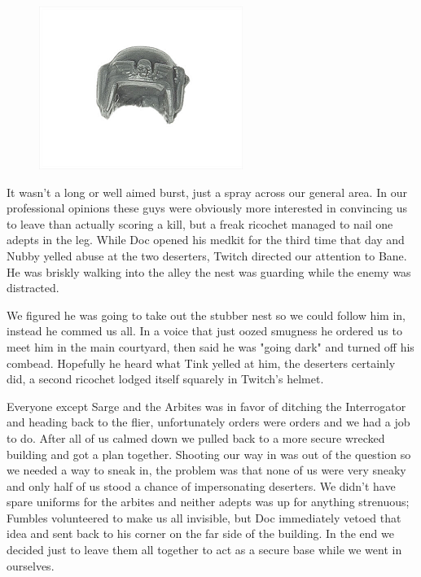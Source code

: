 \begin{figure}
	\begin{center}
		\includegraphics[width=\figwidth]{pics/9/24.png}
	\end{center}
\end{figure}
It wasn't a long or well aimed burst, just a spray across our general area. 
In our professional opinions these guys were obviously more interested in convincing us to leave than actually scoring a kill, but a freak ricochet managed to nail one adepts in the leg. 
While Doc opened his medkit for the third time that day and Nubby yelled abuse at the two deserters, Twitch directed our attention to Bane. 
He was briskly walking into the alley the nest was guarding while the enemy was distracted. 


We figured he was going to take out the stubber nest so we could follow him in, instead he commed us all. 
In a voice that just oozed smugness he ordered us to meet him in the main courtyard, then said he was "going dark" and turned off his combead. 
Hopefully he heard what Tink yelled at him, the deserters certainly did, a second ricochet lodged itself squarely in Twitch's helmet.

Everyone except Sarge and the Arbites was in favor of ditching the Interrogator and heading back to the flier, unfortunately orders were orders and we had a job to do. 
After all of us calmed down we pulled back to a more secure wrecked building and got a plan together. 
Shooting our way in was out of the question so we needed a way to sneak in, the problem was that none of us were very sneaky and only half of us stood a chance of impersonating deserters. 
We didn't have spare uniforms for the arbites and neither adepts was up for anything strenuous; 
Fumbles volunteered to make us all invisible, but Doc immediately vetoed that idea and sent back to his corner on the far side of the building. 
In the end we decided just to leave them all together to act as a secure base while we went in ourselves.

